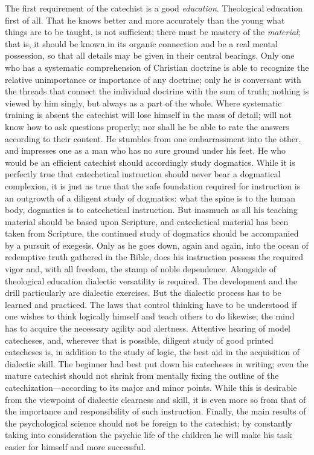 The first requirement of the catechist is a good \emph{education}. Theological education first of all. That he knows better and more accurately than the young what things are to be taught, is not sufficient; there must be mastery of the \emph{material}; that is, it should be known in its organic connection and be a real mental possession, so that all details may be given in their central bearings. Only one who has a systematic comprehension of Christian doctrine is able to recognize the relative unimportance or importance of any doctrine; only he is conversant with the threads that connect the individual doctrine with the sum of truth; nothing is viewed by him singly, but always as a part of the whole. Where systematic training is absent the catechist will lose himself in the mass of detail; will not know how to ask questions properly; nor shall he be able to rate the answers according to their content. He stumbles from one embarrassment into the other, and impresses one as a man who has
no sure ground under his feet. He who would be an efficient catechist should accordingly study dogmatics. While it is perfectly true that catechetical instruction should never bear a dogmatical complexion, it is just as true that the safe foundation required for instruction is an outgrowth of a diligent study of dogmatics: what the spine is to the human body, dogmatics is to catechetical instruction. But inasmuch as all his teaching material should be based upon Scripture, and catechetical material has been taken from Scripture, the continued study of dogmatics should be accompanied by a pursuit of exegesis. Only as he goes down, again and again, into the ocean of redemptive truth gathered in the Bible, does his instruction possess the required vigor and, with all freedom, the stamp of noble dependence. Alongside of theological education dialectic versatility is required. The development and the drill particularly are dialectic exercises. But the dialectic process has to be learned and practiced. The laws that control thinking have to be understood if one wishes to think logically himself and teach others to do likewise; the mind has to acquire the necessary agility and alertness. Attentive hearing of model catecheses, and, wherever that is possible, diligent study of good printed catecheses is, in addition to the study of logic, the best aid in the acquisition of dialectic skill. The beginner had best put down his catecheses in writing; even the mature catechist should not shrink from mentally fixing the outline of the catechization—according to its major and minor points. While this is desirable from the viewpoint of dialectic clearness and skill, it is even more so from that of the importance and responsibility of such instruction. Finally, the main results of the psychological science should not be foreign to the catechist; by constantly taking into consideration the psychic life of the children he will make his task easier for himself and more successful.


